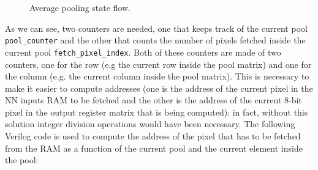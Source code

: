 \documentclass[11pt]{report}
\begin{document}
\begin{figure}[!h]
\centering
{}
\caption{Average pooling state flow.}
\label{fig:average_pool_fsm}
\end{figure}
As we can see, two counters are needed, one that keeps track of the current pool \texttt{pool\_counter} and the other that counts the number of pixels fetched inside the current pool \texttt{fetch\_pixel\_index}. Both of these counters are made of two counters, one for the row (e.g the current row inside the pool matrix) and one for the column (e.g. the current column inside the pool matrix). This is necessary to make it easier to compute addresses (one is the address of the current pixel in the NN inputs RAM to be fetched and the other is the address of the current 8-bit pixel in the output register matrix that is being computed): in fact, without this solution integer division operations would have been necessary. The following Verilog code is used to compute the address of the pixel that has to be fetched from the RAM as a function of the current pool and the current element inside the pool:
\end{document}
